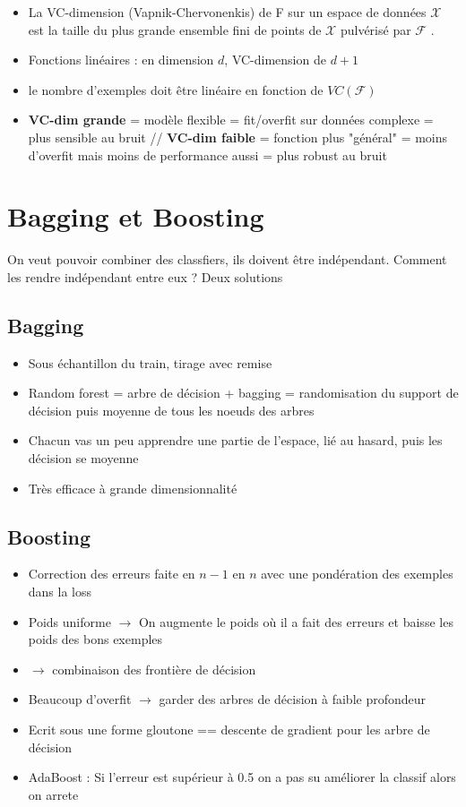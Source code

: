 \documentclass{article}
\begin{document}
\begin{multicols}{2}
\begin{itemize}
\begin{itemize}
        \item La VC-dimension (Vapnik-Chervonenkis) de F sur un espace de données $ \mathcal{X} $  est la taille du plus grande ensemble fini de points de $ \mathcal{X} $  pulvérisé par $ \mathcal{F} $ .
        \item Fonctions linéaires : en dimension $ d $, VC-dimension de $ d + 1 $
        \item le nombre d'exemples doit être linéaire en fonction de $ VC(\mathcal{F}) $ 
        \item \textbf{VC-dim grande} = modèle flexible = fit/overfit sur données complexe = plus sensible au bruit // \textbf{VC-dim faible} = fonction plus "général" = moins d'overfit mais moins de performance aussi = plus robust au bruit 
    \end{itemize}
\end{itemize}

\section{Bagging et Boosting}
On veut pouvoir combiner des classfiers, ils doivent être indépendant. Comment les rendre indépendant entre eux ? Deux solutions

\subsection{Bagging}
\begin{itemize}
    \item Sous échantillon du train, tirage avec remise
    \item Random forest = arbre de décision + bagging = randomisation du support de décision puis moyenne de tous les noeuds des arbres 
    \item Chacun vas un peu apprendre une partie de l'espace, lié au hasard, puis les décision se moyenne
    \item Très efficace à grande dimensionnalité
\end{itemize}

\subsection{Boosting}
\begin{itemize}
    \item Correction des erreurs faite en $ n-1 $ en $ n $ avec une pondération des exemples dans la loss
    \item Poids uniforme $\rightarrow$ On augmente le poids où il a fait des erreurs et baisse les poids des bons exemples
    \item $\rightarrow$ combinaison des frontière de décision
    \item Beaucoup d'overfit $\rightarrow$ garder des arbres de décision à faible profondeur
    \item Ecrit sous une forme gloutone == descente de gradient pour les arbre de décision 
    \item AdaBoost : Si l'erreur est supérieur à 0.5 on a pas su améliorer la classif alors on arrete
\end{itemize}



\end{multicols}
\end{document}
